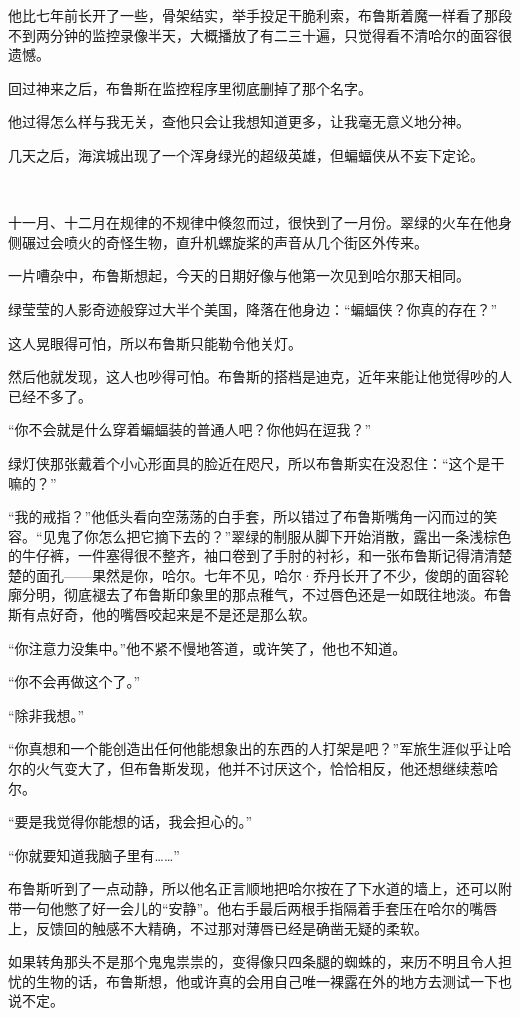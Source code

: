\documentclass[../main]{subfiles}
\begin{document}
他比七年前长开了一些，骨架结实，举手投足干脆利索，布鲁斯着魔一样看了那段不到两分钟的监控录像半天，大概播放了有二三十遍，只觉得看不清哈尔的面容很遗憾。

回过神来之后，布鲁斯在监控程序里彻底删掉了那个名字。

他过得怎么样与我无关，查他只会让我想知道更多，让我毫无意义地分神。

几天之后，海滨城出现了一个浑身绿光的超级英雄，但蝙蝠侠从不妄下定论。

~\

十一月、十二月在规律的不规律中倏忽而过，很快到了一月份。翠绿的火车在他身侧碾过会喷火的奇怪生物，直升机螺旋桨的声音从几个街区外传来。

一片嘈杂中，布鲁斯想起，今天的日期好像与他第一次见到哈尔那天相同。

绿莹莹的人影奇迹般穿过大半个美国，降落在他身边：“蝙蝠侠？你真的存在？”

这人晃眼得可怕，所以布鲁斯只能勒令他关灯。

然后他就发现，这人也吵得可怕。布鲁斯的搭档是迪克，近年来能让他觉得吵的人已经不多了。

“你不会就是什么穿着蝙蝠装的普通人吧？你他妈在逗我？”

绿灯侠那张戴着个小心形面具的脸近在咫尺，所以布鲁斯实在没忍住：“这个是干嘛的？”

“我的戒指？”他低头看向空荡荡的白手套，所以错过了布鲁斯嘴角一闪而过的笑容。“见鬼了你怎么把它摘下去的？”翠绿的制服从脚下开始消散，露出一条浅棕色的牛仔裤，一件塞得很不整齐，袖口卷到了手肘的衬衫，和一张布鲁斯记得清清楚楚的面孔——果然是你，哈尔。七年不见，哈尔·乔丹长开了不少，俊朗的面容轮廓分明，彻底褪去了布鲁斯印象里的那点稚气，不过唇色还是一如既往地淡。布鲁斯有点好奇，他的嘴唇咬起来是不是还是那么软。

“你注意力没集中。”他不紧不慢地答道，或许笑了，他也不知道。

“你不会再做这个了。”

“除非我想。”

“你真想和一个能创造出任何他能想象出的东西的人打架是吧？”军旅生涯似乎让哈尔的火气变大了，但布鲁斯发现，他并不讨厌这个，恰恰相反，他还想继续惹哈尔。

“要是我觉得你能想的话，我会担心的。”

“你就要知道我脑子里有……”

布鲁斯听到了一点动静，所以他名正言顺地把哈尔按在了下水道的墙上，还可以附带一句他憋了好一会儿的“安静”。他右手最后两根手指隔着手套压在哈尔的嘴唇上，反馈回的触感不大精确，不过那对薄唇已经是确凿无疑的柔软。

如果转角那头不是那个鬼鬼祟祟的，变得像只四条腿的蜘蛛的，来历不明且令人担忧的生物的话，布鲁斯想，他或许真的会用自己唯一裸露在外的地方去测试一下也说不定。
\end{document}

